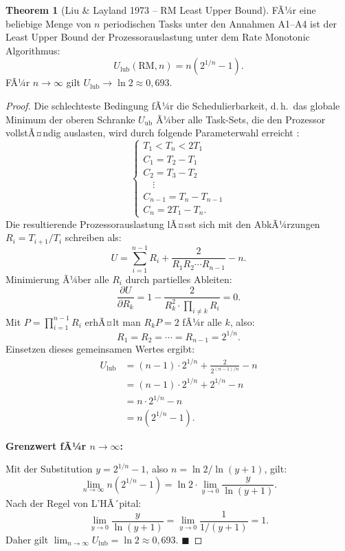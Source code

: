 ﻿\documentclass[a4paper,12pt]{report}
\theoremstyle{definition}
\newtheorem{theorem}{Theorem}[chapter]
\begin{document}
\begin{theorem}[Liu \& Layland 1973 -- RM Least Upper Bound]
	\label{satz:rm_lub}
	FÃ¼r eine beliebige Menge von $n$ periodischen Tasks unter den Annahmen A1--A4
	ist der Least Upper Bound der Prozessorauslastung unter dem Rate Monotonic
	Algorithmus:
	\[
		U_{\text{lub}}(\text{RM}, n) = n\left(2^{1/n} - 1\right).
	\]
	FÃ¼r $n \to \infty$ gilt $U_{\text{lub}} \to \ln 2 \approx 0{,}693$.
\end{theorem}

\begin{proof}
	Die schlechteste Bedingung fÃ¼r die Schedulierbarkeit, d.\,h.\ das globale
	Minimum der oberen Schranke $U_{\text{ub}}$ Ã¼ber alle Task-Sets, die den
	Prozessor vollstÃ¤ndig auslasten, wird durch folgende Parameterwahl erreicht
	\cite{Liu1973}:
	\begin{equation}
		\begin{cases}
			T_1 < T_n < 2 T_1 \\
			C_1 = T_2 - T_1 \\
			C_2 = T_3 - T_2 \\
			\quad\vdots \\
			C_{n-1} = T_n - T_{n-1} \\
			C_n = 2T_1 - T_n.
		\end{cases}
		\label{eq:worst_case_params}
	\end{equation}
	Die resultierende Prozessorauslastung lÃ¤sst sich mit den AbkÃ¼rzungen
	$R_i = T_{i+1}/T_i$ schreiben als:
	\[
		U = \sum_{i=1}^{n-1} R_i + \frac{2}{R_1 R_2 \cdots R_{n-1}} - n.
	\]
	Minimierung Ã¼ber alle $R_i$ durch partielles Ableiten:
	\[
		\frac{\partial U}{\partial R_k} = 1 - \frac{2}{R_k^2 \cdot \prod_{i \neq k} R_i} = 0.
	\]
	Mit $P = \prod_{i=1}^{n-1} R_i$ erhÃ¤lt man $R_k P = 2$ fÃ¼r alle $k$, also:
	\[
		R_1 = R_2 = \cdots = R_{n-1} = 2^{1/n}.
	\]
	Einsetzen dieses gemeinsamen Wertes ergibt:
	\begin{align*}
		U_{\text{lub}}
		&= (n-1) \cdot 2^{1/n} + \frac{2}{2^{(n-1)/n}} - n \\
		&= (n-1) \cdot 2^{1/n} + 2^{1/n} - n \\
		&= n \cdot 2^{1/n} - n \\
		&= n(2^{1/n} - 1).
	\end{align*}

	\textbf{Grenzwert fÃ¼r $n \to \infty$:}

	Mit der Substitution $y = 2^{1/n} - 1$, also $n = \ln 2 / \ln(y+1)$, gilt:
	\[
		\lim_{n \to \infty} n(2^{1/n} - 1) = \ln 2 \cdot \lim_{y \to 0} \frac{y}{\ln(y+1)}.
	\]
	Nach der Regel von L'HÃ´pital:
	\[
		\lim_{y \to 0} \frac{y}{\ln(y+1)} = \lim_{y \to 0} \frac{1}{1/(y+1)} = 1.
	\]
	Daher gilt $\lim_{n\to\infty} U_{\text{lub}} = \ln 2 \approx 0{,}693$. \hfill$\blacksquare$
\end{proof}
\end{document}
